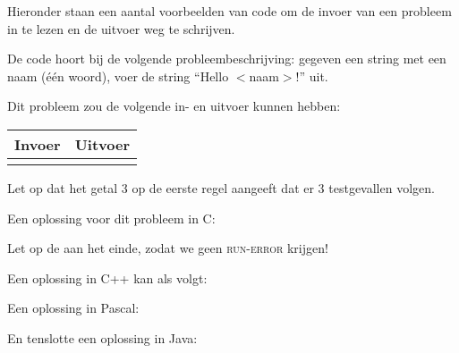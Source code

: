 Hieronder staan een aantal voorbeelden van code om de invoer van een
probleem in te lezen en de uitvoer weg te schrijven.

De code hoort bij de volgende probleembeschrijving: gegeven een string
met een naam (\'e\'en woord), voer de string ``Hello $<$naam$>$!'' uit.

Dit probleem zou de volgende in- en uitvoer kunnen hebben:

\begin{tabular}{|p{}|p{}|}
\hline
\textbf{Invoer} & \textbf{Uitvoer} \\
\hline
 &
 \\
\hline
\end{tabular}

Let op dat het getal 3 op de eerste regel aangeeft dat er 3
testgevallen volgen.

Een oplossing voor dit probleem in C:

Let op de  aan het einde, zodat we geen
\textsc{run-error} krijgen!

\newpage

Een oplossing in C++ kan als volgt:

Een oplossing in Pascal:

\newpage

En tenslotte een oplossing in Java:


